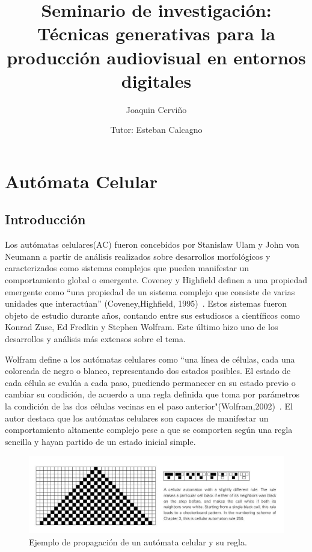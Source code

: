 \documentclass[16pt,spanish]{article}
\title{Seminario de investigación: \\
Técnicas generativas para la producción audiovisual en entornos digitales}
\author{Joaquin Cerviño\\
        \and
        Tutor: Esteban Calcagno\\}
\begin{document}
\maketitle
{}
\newpage
{}

\section{Autómata Celular}
\subsection{Introducción}

		Los autómatas celulares(AC) fueron concebidos por Stanislaw Ulam y John von
Neumann a partir de análisis realizados sobre desarrollos morfológicos y caracterizados como
sistemas complejos que pueden manifestar un comportamiento global o emergente.
Coveney y Highfield definen a una propiedad emergente como “una propiedad de un
sistema complejo que consiste de varias unidades que interactúan” (Coveney,Highfield,
1995)~\cite{highfield1996frontiers}. Estos sistemas fueron objeto de estudio durante años, contando entre sus
estudiosos a científicos como Konrad Zuse, Ed Fredkin y Stephen
Wolfram. Este último hizo uno de los desarrollos y análisis más
extensos sobre el tema. 		

Wolfram define a los autómatas celulares como ``una línea de células, cada una
coloreada de negro o blanco, representando dos estados posibles. El estado de
cada célula se evalúa a cada paso, puediendo permanecer en su estado previo o
cambiar su condición, de acuerdo a una regla definida que toma por parámetros
la condición de las dos células vecinas en el paso
anterior"(Wolfram,2002)~\cite{wolfram2002new}. El autor destaca que los
autómatas celulares son capaces de manifestar un comportamiento altamente
complejo pese a que se comporten según una regla sencilla y hayan partido de un
estado inicial simple. 

\begin{figure}[ht]
	\centering
	\includegraphics[width=\linewidth, bb = 0 0 1096 33]{imagesCA/Example-2.jpg}
	\caption{Ejemplo de propagación de un autómata celular y su regla.~\cite{wolfram2002new}}
\end{figure}
\end{document}
